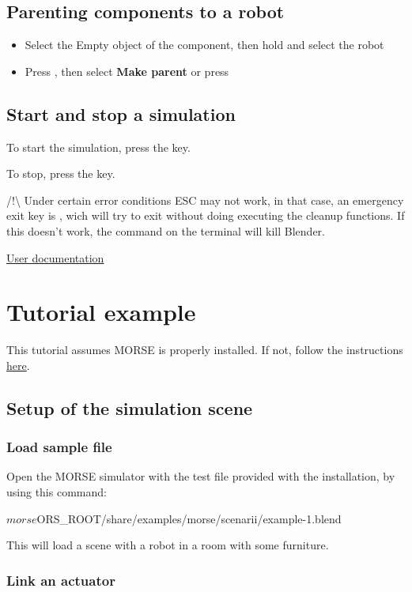 \documentclass[twoside,a4paper,10pt]{report}
\newcommand{\dokutitlelevelone}[1]{\chapter{#1}}
\newcommand{\dokutitleleveltwo}[1]{\section{#1}}
\newcommand{\dokutitleleveltree}[1]{\subsection{#1}}
\newcommand{\dokubold}[1]{\textbf{#1}}
\newcommand{\dokuitem}{\item}
\newcommand{\dokuquoting}{\textbar}
\begin{document}
\dokutitleleveltwo{Parenting components to a robot}
\label{5c8528e5d80c7c0537856e0911e6cdc8}%

\begin{itemize}
\dokuitem  Select the Empty object of the component, then hold  and select the robot
\dokuitem  Press , then select \dokubold{Make parent} or press 
\end{itemize}

\dokutitleleveltwo{Start and stop a simulation}
\label{466b971dc2d338787d665353c2a0f40a}%

To start the simulation, press the  key.

To stop, press the  key.

/!{\textbackslash} Under certain error conditions ESC may not work, in that case, an emergency exit
key is , wich will try to exit without doing executing the 
cleanup functions. If this doesn't work, the command  on the 
terminal will kill Blender.

{\dokuquoting}{\dokuquoting} \hyperref[a80da1282f2c775bbc5f2c92c836968b]{ User documentation}


\dokutitlelevelone{Tutorial example}
\label{d0e1bed8b40ec8e4f9cc0cc0a11ff110}%
\label{0575c8d592fb7b088226750aceec2b4e}%

This tutorial assumes MORSE is properly installed. If not, follow the instructions \hyperref[ea09bb364ef1bffd889e76b7a59035fc]{ here}.


\dokutitleleveltwo{Setup of the simulation scene}
\label{80527725485ea9e7bedbc9d918895a02}%

\dokutitleleveltree{Load sample file}
\label{4238ab1e3d8f80f2fdec7f34e17e0f67}%

Open the MORSE simulator with the test file provided with the installation, by using this command:



\small
\begin{verbatimtab}
$ morse $ORS_ROOT/share/examples/morse/scenarii/example-1.blend
\end{verbatimtab}
\normalsize

This will load a scene with a robot in a room with some furniture.


\dokutitleleveltree{Link an actuator}
\label{81c6b973417d3e5000d27d9c1c805b96}%
\end{document}
